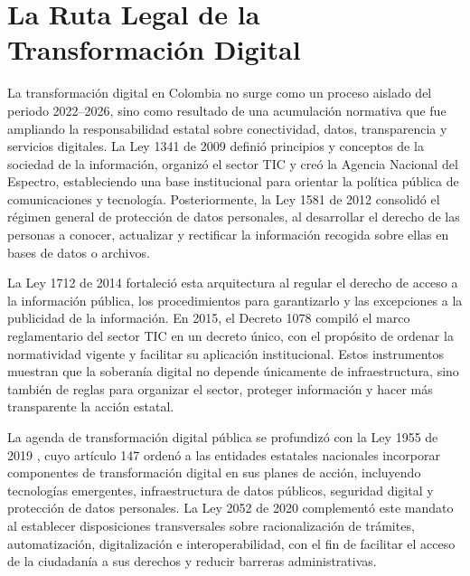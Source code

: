 \documentclass[9pt,letterpaper,twocolumn,twoside,apabib]{rho-class/rho}
\begin{document}

\section{La Ruta Legal de la Transformación Digital}

La transformación digital en Colombia no surge como un proceso aislado del periodo 2022--2026, sino como resultado de una acumulación normativa que fue ampliando la responsabilidad estatal sobre conectividad, datos, transparencia y servicios digitales. La Ley 1341 de 2009 \parencite{ley_1341_2009} definió principios y conceptos de la sociedad de la información, organizó el sector TIC y creó la Agencia Nacional del Espectro, estableciendo una base institucional para orientar la política pública de comunicaciones y tecnología. Posteriormente, la Ley 1581 de 2012 \parencite{ley_1581_2012} consolidó el régimen general de protección de datos personales, al desarrollar el derecho de las personas a conocer, actualizar y rectificar la información recogida sobre ellas en bases de datos o archivos.

La Ley 1712 de 2014 \parencite{ley_1712_2014} fortaleció esta arquitectura al regular el derecho de acceso a la información pública, los procedimientos para garantizarlo y las excepciones a la publicidad de la información. En 2015, el Decreto 1078 \parencite{decreto_1078_2015} compiló el marco reglamentario del sector TIC en un decreto único, con el propósito de ordenar la normatividad vigente y facilitar su aplicación institucional. Estos instrumentos muestran que la soberanía digital no depende únicamente de infraestructura, sino también de reglas para organizar el sector, proteger información y hacer más transparente la acción estatal.

La agenda de transformación digital pública se profundizó con la Ley 1955 de 2019 \parencite{ley_1955_2019}, cuyo artículo 147 ordenó a las entidades estatales nacionales incorporar componentes de transformación digital en sus planes de acción, incluyendo tecnologías emergentes, infraestructura de datos públicos, seguridad digital y protección de datos personales. La Ley 2052 de 2020 \parencite{ley_2052_2020} complementó este mandato al establecer disposiciones transversales sobre racionalización de trámites, automatización, digitalización e interoperabilidad, con el fin de facilitar el acceso de la ciudadanía a sus derechos y reducir barreras administrativas.
\end{document}
